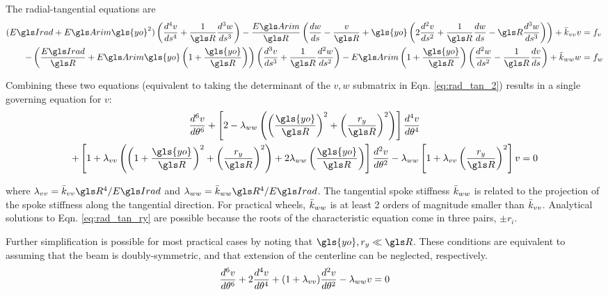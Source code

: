 \documentclass[\rootdir/thesis.tex]{subfiles}
\begin{document}
The radial-tangential equations are
\begin{subequations}
\begin{align}
\label{eq:rad_tan_2}
(\EIr + \EA \gls{yo}^2)\left( \ds{v}{4} + \frac{1}{\R}\ds{w}{3} \right) -
    \frac{\EA}{\R}\left( \frac{dw}{ds} - \frac{v}{\R} +\gls{yo}\left(2\ds{v}{2} + \frac{1}{\R}\frac{dw}{ds} -
    \R\ds{w}{3}\right) \right) +\bar{k}_{vv}v &= f_v\\
-\left( \frac{\EIr}{\R} + \EA \gls{yo}\left( 1 + \frac{\gls{yo}}{\R} \right) \right)
    \left(\ds{v}{3} + \frac{1}{\R}\ds{w}{2} \right) -
    \EA\left(1+\frac{\gls{yo}}{\R} \right) \left(\ds{w}{2} - \frac{1}{\R}\frac{dv}{ds} \right) + \bar{k}_{ww}w &= f_w
\end{align}
\end{subequations}

Combining these two equations (equivalent to taking the determinant of the $v,w$ submatrix in Eqn. \eqref{eq:rad_tan_2}) results in a single governing equation for $v$:
\begin{multline}
\label{eq:rad_tan_ry}
\dt{v}{6} + \left[2-\lr_{ww}\left(\left(\frac{\gls{yo}}{\R}\right)^2 +
                                        \left(\frac{\ry}{\R}\right)^2 \right) \right] \dt{v}{4}\\
          + \left[1+\lr_{vv}\left(\left(1+\frac{\gls{yo}}{\R}\right)^2+\left(\frac{\ry}{\R}\right)^2\right)
                   +2\lr_{ww}\left(\frac{\gls{yo}}{\R}\right)\right]\dt{v}{2}
          - \lr_{ww}\left[1+\lr_{vv}\left(\frac{\ry}{\R}\right)^2\right] v = 0
\end{multline}

where $\lr_{vv}=\kvv\R^4/\EIr$ and $\lr_{ww}=\kww\R^4/\EIr$. The tangential spoke stiffness $\bar{k}_{ww}$ is related to the projection of the spoke stiffness along the tangential direction. For practical wheels, $\bar{k}_{ww}$ is at least 2 orders of magnitude smaller than $\bar{k}_{vv}$. Analytical solutions to Eqn. \eqref{eq:rad_tan_ry} are possible because the roots of the characteristic equation come in three pairs, $\pm r_i$.

Further simplification is possible for most practical cases by noting that $\gls{yo},\ry \ll \R$. These conditions are equivalent to assuming that the beam is doubly-symmetric, and that extension of the centerline can be neglected, respectively.
\begin{equation}
\label{eq:rad_tan}
\frac{d^6v}{d\theta^6} + 2\frac{d^4v}{d\theta^4}+(1+\lambda_{vv})\frac{d^2v}{d\theta^2} - \lambda_{ww}v=0
\end{equation}
\end{document}
